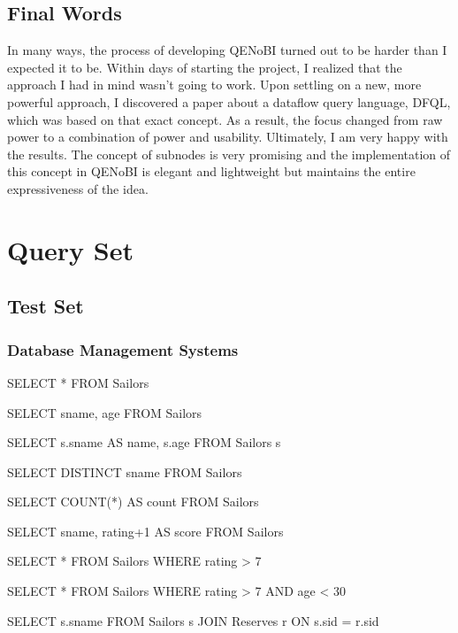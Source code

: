 \documentclass[11pt,a4paper]{globis-book}
\begin{document}
\section{Final Words}
In many ways, the process of developing QENoBI turned out to be harder than I expected it to be. Within days of starting the project, I realized that the approach I had in mind wasn't going to work. Upon settling on a new, more powerful approach, I discovered a paper about a dataflow query language, DFQL, which was based on that exact concept. As a result, the focus changed from raw power to a combination of power and usability. Ultimately, I am very happy with the results. The concept of subnodes is very promising and the implementation of this concept in QENoBI is elegant and lightweight but maintains the entire expressiveness of the idea.

\lipsum[1]
\appendix
\chapter{Query Set}
\label{app:test_set}

\section*{Test Set}

\subsection*{Database Management Systems}
\begin{setq}
SELECT *
FROM Sailors
\end{setq}
\begin{setq}
SELECT sname, age
FROM Sailors
\end{setq}
\begin{setq}
SELECT s.sname AS name, s.age
FROM Sailors s
\end{setq}
\begin{setq}
SELECT DISTINCT sname
FROM Sailors
\end{setq}
\begin{setq}
SELECT COUNT(*) AS count
FROM Sailors
\end{setq}
\begin{setq}
SELECT sname, rating+1 AS score
FROM Sailors
\end{setq}
\begin{setq}
SELECT *
FROM Sailors
WHERE rating > 7
\end{setq}
\begin{setq}
SELECT *
FROM Sailors
WHERE rating > 7 AND age < 30
\end{setq}
\begin{setq}
SELECT s.sname
FROM Sailors s JOIN Reserves r ON s.sid = r.sid
\end{setq}
\end{document}
